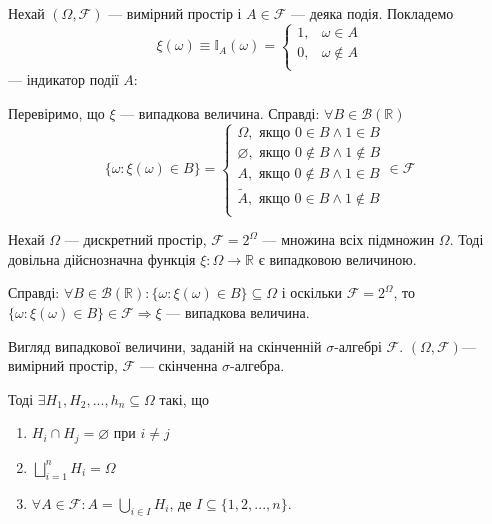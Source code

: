\begin{example}
    Нехай $(\Omega, \mathcal{F})$ --- вимірний простір
    і $A \in \mathcal{F}$ --- деяка подія. 
    Покладемо 
    $$\xi(\omega) \equiv \mathbb{I}_A(\omega) = \left\{ \begin{array}{ll}
        1, & \omega \in A \\
        0, & \omega \notin A \\
    \end{array} \right.$$
    --- індикатор події $A$:
    
    Перевіримо, що $\xi$ --- випадкова величина. Справді: 
    $\forall B \in \mathcal{B}(\mathbb{R})$
    $$\{\omega: \xi(\omega) \in B \} = \left\{ \begin{array}{l}
        \Omega,         \text{ якщо } 0 \in B \wedge 1 \in B \\
        \varnothing,    \text{ якщо } 0 \notin B \wedge 1 \notin B \\
        A,              \text{ якщо } 0 \notin B \wedge 1 \in B \\
        \widetilde{A},  \text{ якщо } 0 \in B \wedge 1 \notin B \\
    \end{array} \right. \in \mathcal{F}$$
\end{example}

\begin{example}
    Нехай $\Omega$ --- дискретний простір, $\mathcal{F} = 2^{\Omega}$
    --- множина всіх підмножин $\Omega$.
    Тоді довільна дійснозначна функція $\xi: \Omega \rightarrow \mathbb{R}$
    є випадковою величиною.
    
    Справді: 
    $\forall B \in \mathcal{B}(\mathbb{R}): \{\omega: \xi(\omega) \in B \} \subseteq \Omega$
    і оскільки $\mathcal{F} = 2^{\Omega}$, то 
    $\{\omega: \xi(\omega) \in B \} \in \mathcal{F} \Rightarrow \xi$ --- випадкова величина.
\end{example}

\begin{example}
    Вигляд випадкової величини, заданій на скінченній $\sigma$-алгебрі $\mathcal{F}$.
    $(\Omega, \mathcal{F})$--- вимірний простір, $\mathcal{F}$ --- скінченна $\sigma$-алгебра. 
    
    Тоді $\exists H_1, H_2, ..., h_n \subseteq \Omega$ такі, що
    \begin{enumerate}
        \item $H_i \cap H_j = \varnothing$ при $i \neq j$
        \item $\bigsqcup\limits_{i=1}^{n} H_i = \Omega$
        \item $\forall A \in \mathcal{F}: A = \bigcup\limits_{i \in I} H_i$,
        де $I \subseteq \{1, 2, ..., n\}$. 
    \end{enumerate}
\end{example}

